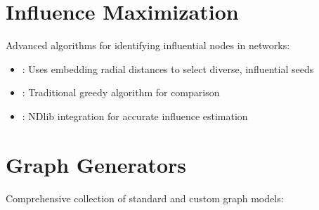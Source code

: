 \documentclass[letterpaper,10pt,english]{sphinxmanual}
\begin{document}
\section{Influence Maximization}
\label{\detokenize{index:influence-maximization}}
\sphinxAtStartPar
Advanced algorithms for identifying influential nodes in networks:
\begin{itemize}
\item {} 
\sphinxAtStartPar
{}: Uses embedding radial distances to select diverse, influential seeds

\item {} 
\sphinxAtStartPar
{}: Traditional greedy algorithm for comparison

\item {} 
\sphinxAtStartPar
{}: NDlib integration for accurate influence estimation

\end{itemize}


\section{Graph Generators}
\label{\detokenize{index:graph-generators}}
\sphinxAtStartPar
Comprehensive collection of standard and custom graph models:
\end{document}
